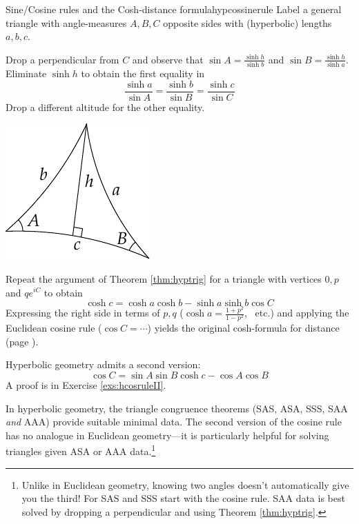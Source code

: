 \begin{cor}{Sine/Cosine rules and the Cosh-distance formula}{hypcossinerule}
	Label a general triangle with angle-measures $A,B,C$ opposite sides with (hyperbolic) lengths $a,b,c$.
	\begin{description}
		\begin{minipage}[t]{0.74\linewidth}\vspace{-8pt}
			\item[Sine Rule] Drop a perpendicular from $C$ and observe that $\sin A=\frac{\sinh h}{\sinh b}$ and $\sin B=\frac{\sinh h}{\sinh a}$. Eliminate $\sinh h$ to obtain the first equality in
			\[
				\frac{\sinh a}{\sin A}=\frac{\sinh b}{\sin B}=\frac{\sinh c}{\sin C}
			\]
			Drop a different altitude for the other equality.
		\end{minipage}
		\hfill
		\begin{minipage}[t]{0.25\linewidth}\vspace{-15pt}
			\flushright\includegraphics[scale=0.95]{isom-sine}
		\end{minipage}\par
			
		\item[Cosine Rule I] Repeat the argument of Theorem \ref{thm:hyptrig} for a triangle with vertices $0,p$ and $qe^{iC}$ to obtain
		\[
			\cosh c=\cosh a\cosh b-\sinh a\sinh b\cos C
		\]
		Expressing the right side in terms of $p,q$ ($\cosh a=\frac{1+p^2}{1-p^2}$, \ etc.) and applying the Euclidean cosine rule ($\cos C=\cdots$) yields the original cosh-formula for distance (page \pageref{lemm:distformula}).
		\item[Cosine Rule II] Hyperbolic geometry admits a second version:
		\[
			\cos C=\sin A\sin B\cosh c-\cos A\cos B
		\]
		A proof is in Exercise \ref{exs:hcosruleII}.
	\end{description}
\end{cor}


In hyperbolic geometry, the triangle congruence theorems (SAS, ASA, SSS, SAA \emph{and} AAA) provide suitable minimal data. The second version of the cosine rule has no analogue in Euclidean geometry---it is particularly helpful for solving triangles given ASA or AAA data.\footnote{%
	Unlike in Euclidean geometry, knowing two angles doesn't automatically give you the third! For SAS and SSS start with the cosine rule. SAA data is best solved by dropping a perpendicular and using Theorem \ref{thm:hyptrig}.%
}


